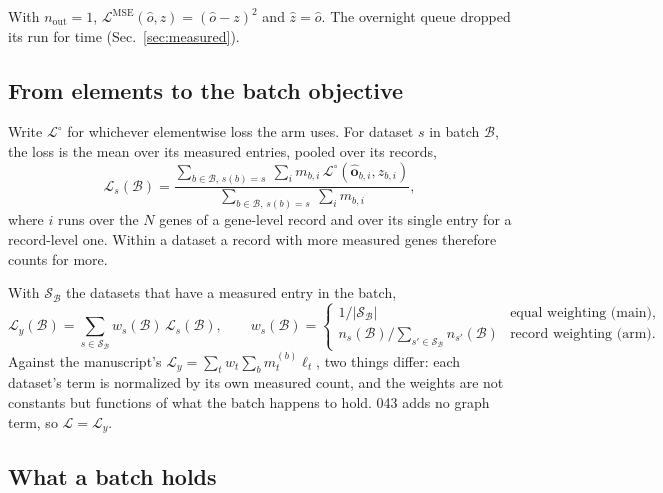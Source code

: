 With $n_{\mathrm{out}} = 1$, $\mathcal{L}^{\mathrm{MSE}}(\hat o, z) = (\hat o - z)^2$ and
$\hat z = \hat o$. The overnight queue dropped its run for time (Sec.~\ref{sec:measured}).

\subsection{From elements to the batch objective}
\label{sec:batchobjective}

Write $\mathcal{L}^{\circ}$ for whichever elementwise loss the arm uses. For dataset $s$ in
batch $\mathcal{B}$, the loss is the mean over its measured entries, pooled over its records,
\begin{equation}
\mathcal{L}_s(\mathcal{B}) = \frac{\sum_{b \in \mathcal{B},\, s(b) = s}\ \sum_{i} m_{b,i}\, \mathcal{L}^{\circ}(\hat{\mathbf{o}}_{b,i}, z_{b,i})}{\sum_{b \in \mathcal{B},\, s(b) = s}\ \sum_{i} m_{b,i}},
\label{eq:dsmean}
\end{equation}
where $i$ runs over the $N$ genes of a gene-level record and over its single entry for a
record-level one. Within a dataset a record with more measured genes therefore counts for
more.

With $\mathcal{S}_{\mathcal{B}}$ the datasets that have a measured entry in the batch,
\begin{equation}
\mathcal{L}_y(\mathcal{B}) = \sum_{s \in \mathcal{S}_{\mathcal{B}}} w_s(\mathcal{B})\, \mathcal{L}_s(\mathcal{B}),
\qquad
w_s(\mathcal{B}) =
\begin{cases}
1 / |\mathcal{S}_{\mathcal{B}}| & \text{equal weighting (main)},\\
n_s(\mathcal{B}) \big/ \sum_{s' \in \mathcal{S}_{\mathcal{B}}} n_{s'}(\mathcal{B}) & \text{record weighting (arm)}.
\end{cases}
\label{eq:objective}
\end{equation}
Against the manuscript's $\mathcal{L}_y = \sum_t w_t \sum_b m^{(b)}_t \ell_t$, two things
differ: each dataset's term is normalized by its own measured count, and the weights are not
constants but functions of what the batch happens to hold. 043 adds no graph term, so
$\mathcal{L} = \mathcal{L}_y$.

\subsection{What a batch holds}
\label{sec:batch}

